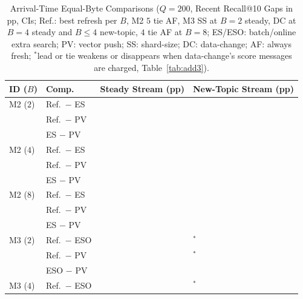 \begin{table}[!t]
\centering
\caption{Arrival-Time Equal-Byte Comparisons ($Q{=}200$, Recent Recall@10 Gaps in pp, \RNumCIPct{} CIs; Ref.: best refresh per $B$, M2 $5$ tie AF, M3 SS at $B{=}2$ steady, DC at $B{=}4$ steady and $B{\le}4$ new-topic, $4$ tie AF at $B{=}8$; ES/ESO: batch/online extra search; PV: vector push; SS: shard-size; DC: data-change; AF: always fresh; $^{\ast}$lead or tie weakens or disappears when data-change's score messages are charged, Table~\ref{tab:add3}).}
\label{tab:m2_m3_equal_bytes}
\scriptsize
\renewcommand{\arraystretch}{0.68}
\setlength{\tabcolsep}{3.0pt}
\begin{tabular}{@{}llll@{}}
\toprule
\textbf{ID ($B$)} & \textbf{Comp.} & \textbf{Steady Stream (pp)} & \textbf{New-Topic Stream (pp)} \\
\midrule
M2 ($2$) & Ref.\ $-$ ES & \RNumHFourRefMinusESBTwoSteadyCell{} & \RNumHFourRefMinusESBTwoNewTopicCell{} \\
 & Ref.\ $-$ PV & \RNumHFourRefMinusPVBTwoSteadyCell{} & \RNumHFourRefMinusPVBTwoNewTopicCell{} \\
 & ES $-$ PV & \RNumHFourESMinusPVBTwoSteadyCell{} & \RNumHFourESMinusPVBTwoNewTopicCell{} \\
M2 ($4$) & Ref.\ $-$ ES & \RNumHFourRefMinusESBFourSteadyCell{} & \RNumHFourRefMinusESBFourNewTopicCell{} \\
 & Ref.\ $-$ PV & \RNumHFourRefMinusPVBFourSteadyCell{} & \RNumHFourRefMinusPVBFourNewTopicCell{} \\
 & ES $-$ PV & \RNumHFourESMinusPVBFourSteadyCell{} & \RNumHFourESMinusPVBFourNewTopicCell{} \\
M2 ($8$) & Ref.\ $-$ ES & \RNumHFourRefMinusESBEightSteadyCell{} & \RNumHFourRefMinusESBEightNewTopicCell{} \\
 & Ref.\ $-$ PV & \RNumHFourRefMinusPVBEightSteadyCell{} & \RNumHFourRefMinusPVBEightNewTopicCell{} \\
 & ES $-$ PV & \RNumHFourESMinusPVBEightSteadyCell{} & \RNumHFourESMinusPVBEightNewTopicCell{} \\
M3 ($2$) & Ref.\ $-$ ESO & \RNumHFourBRefMinusESOBTwoSteadyCell{} & \RNumHFourBRefMinusESOBTwoNewTopicCell{}$^{\ast}$ \\
 & Ref.\ $-$ PV & \RNumHFourBRefMinusPVBTwoSteadyCell{} & \RNumHFourBRefMinusPVBTwoNewTopicCell{}$^{\ast}$ \\
 & ESO $-$ PV & \RNumHFourBESOMinusPVBTwoSteadyCell{} & \RNumHFourBESOMinusPVBTwoNewTopicCell{} \\
M3 ($4$) & Ref.\ $-$ ESO & \RNumHFourBRefMinusESOBFourSteadyCell{} & \RNumHFourBRefMinusESOBFourNewTopicCell{}$^{\ast}$ \\

\end{tabular}
\end{table}
